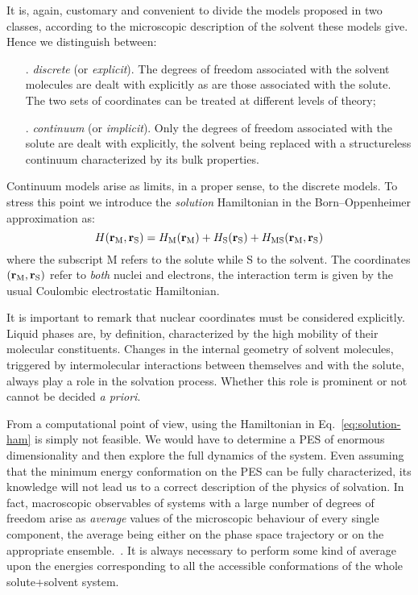 It is, again, customary and convenient to divide the models proposed in
two classes, according to the microscopic description of the solvent
these models give. Hence we distinguish between:
\begin{itemize}
 \item[.] \emph{discrete} (or \emph{explicit}). The degrees of freedom
   associated with the solvent molecules are dealt with explicitly as
   are those associated with the solute. The two sets of coordinates can
   be treated at different levels of theory;
 \item[.] \emph{continuum} (or \emph{implicit}). Only the degrees of
   freedom associated with the solute are dealt with explicitly, the
   solvent being replaced with a structureless continuum characterized
   by its bulk properties.
\end{itemize}

Continuum models arise as limits, in a proper sense, to the discrete
models. To stress this point we introduce the \emph{solution}
Hamiltonian in the Born--Oppenheimer approximation as:
\begin{equation}\label{eq:solution-ham}
 H(\mathbf{r}_\mathrm{M}, \mathbf{r}_\mathrm{S}) =
  H_\mathrm{M}(\mathbf{r}_\mathrm{M}) +  H_\mathrm{S}(\mathbf{r}_\mathrm{S})
+ H_\mathrm{MS}(\mathbf{r}_\mathrm{M}, \mathbf{r}_\mathrm{S})
\end{equation}
where the subscript M refers to the solute while S to the solvent. The
coordinates $(\mathbf{r}_\mathrm{M}, \mathbf{r}_\mathrm{S})$ refer to
\emph{both} nuclei and electrons, the interaction term is given by the
usual Coulombic electrostatic Hamiltonian.

It is important to remark that nuclear coordinates must be considered
explicitly. Liquid phases are, by definition, characterized by the high
mobility of their molecular constituents. Changes in the internal
geometry of solvent molecules, triggered by intermolecular interactions
between themselves and with the solute, always play a role in the
solvation process. Whether this role is prominent or not cannot be
decided \emph{a priori}.

From a computational point of view, using the Hamiltonian in Eq.~\eqref{eq:solution-ham} is simply not feasible. We would have to
determine a \acs{PES} of enormous dimensionality and then explore the full
dynamics of the system. Even assuming that the minimum energy
conformation on the \acs{PES} can be fully characterized, its knowledge will
not lead us to a correct description of the physics of solvation. In
fact, macroscopic observables of systems with a large number of degrees
of freedom arise as \emph{average} values of the microscopic behaviour
of every single component, the average being either on the phase space
trajectory or on the appropriate ensemble.~\autocite{Hill1960-ql}. It is always
necessary to perform some kind of average upon the energies
corresponding to all the accessible conformations of the whole
solute+solvent system.

